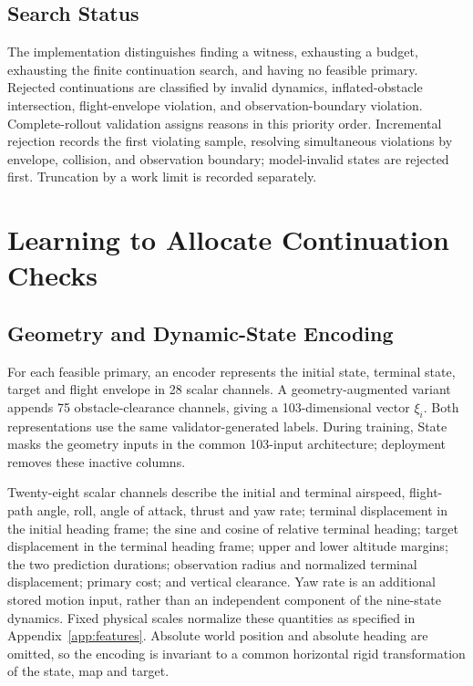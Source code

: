 \documentclass[journal]{IEEEtran}
\begin{document}
\subsection{Search Status}
The implementation distinguishes finding a witness, exhausting a budget, exhausting the finite continuation search, and having no feasible primary. Rejected continuations are classified by invalid dynamics, inflated-obstacle intersection, flight-envelope violation, and observation-boundary violation. Complete-rollout validation assigns reasons in this priority order. Incremental rejection records the first violating sample, resolving simultaneous violations by envelope, collision, and observation boundary; model-invalid states are rejected first. Truncation by a work limit is recorded separately.
\section{Learning to Allocate Continuation Checks}
\subsection{Geometry and Dynamic-State Encoding}
For each feasible primary, an encoder represents the initial state, terminal state, target and flight envelope in 28 scalar channels. A geometry-augmented variant appends 75 obstacle-clearance channels, giving a 103-dimensional vector $\xi_i$. Both representations use the same validator-generated labels. During training, State masks the geometry inputs in the common 103-input architecture; deployment removes these inactive columns.

Twenty-eight scalar channels describe the initial and terminal airspeed, flight-path angle, roll, angle of attack, thrust and yaw rate; terminal displacement in the initial heading frame; the sine and cosine of relative terminal heading; target displacement in the terminal heading frame; upper and lower altitude margins; the two prediction durations; observation radius and normalized terminal displacement; primary cost; and vertical clearance. Yaw rate is an additional stored motion input, rather than an independent component of the nine-state dynamics. Fixed physical scales normalize these quantities as specified in Appendix~\ref{app:features}. Absolute world position and absolute heading are omitted, so the encoding is invariant to a common horizontal rigid transformation of the state, map and target.
\end{document}
